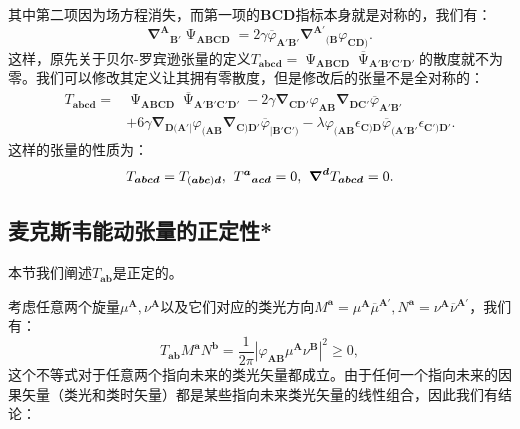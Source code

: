 其中第二项因为场方程消失，而第一项的$\boldsymbol{BCD}$指标本身就是对称的，我们有：
\begin{equation*}
	\boldsymbol{\nabla }^{\boldsymbol{A}}{}_{\boldsymbol{B} '} \upPsi _{\boldsymbol{ABCD}} =2\gamma \overline{\varphi }_{\boldsymbol{A} '\boldsymbol{B} '}\boldsymbol{\nabla }^{\boldsymbol{A} '}{}_{(\boldsymbol{B}} \varphi _{\boldsymbol{CD})} .
\end{equation*}
这样，原先关于贝尔-罗宾逊张量的定义$T_{\boldsymbol{abcd}} =\upPsi _{\boldsymbol{ABCD}}\overline{\upPsi }_{\boldsymbol{A} '\boldsymbol{B} '\boldsymbol{C} '\boldsymbol{D} '}$的散度就不为零。我们可以修改其定义让其拥有零散度，但是修改后的张量不是全对称的：
\begin{equation*}
	\begin{aligned}
		T_{\boldsymbol{abcd}} = & \upPsi _{\boldsymbol{ABCD}}\overline{\upPsi }_{\boldsymbol{A} '\boldsymbol{B} '\boldsymbol{C} '\boldsymbol{D} '} -2\gamma \boldsymbol{\nabla }_{\boldsymbol{CD} '} \varphi _{\boldsymbol{AB}}\boldsymbol{\nabla }_{\boldsymbol{DC} '}\overline{\varphi }_{\boldsymbol{A} '\boldsymbol{B} '}\\
		& +6\gamma \boldsymbol{\nabla }_{\boldsymbol{D}(\boldsymbol{A} '|} \varphi _{(\boldsymbol{AB}}\boldsymbol{\nabla }_{\boldsymbol{C})\boldsymbol{D} '}\overline{\varphi }_{|\boldsymbol{B} '\boldsymbol{C} ')} -\lambda \varphi _{(\boldsymbol{AB}} \epsilon _{\boldsymbol{C})\boldsymbol{D}}\overline{\varphi }_{(\boldsymbol{A} '\boldsymbol{B} '} \epsilon _{\boldsymbol{C} ')\boldsymbol{D} '} .
	\end{aligned}
\end{equation*}
这样的张量的性质为：
\begin{equation*}
	T_{\boldsymbol{abcd}} =T_{(\boldsymbol{abc})\boldsymbol{d}} ,\kern+0.4em T^{\boldsymbol{a}}{}_{\boldsymbol{acd}} =0,\kern+0.4em \boldsymbol{\nabla }^{\boldsymbol{d}} T_{\boldsymbol{abcd}} =0.
\end{equation*}
\subsection{麦克斯韦能动张量的正定性*}

本节我们阐述$T_{\boldsymbol{ab}}$是正定的。



考虑任意两个旋量$\mu ^{\boldsymbol{A}} ,\nu ^{\boldsymbol{A}}$以及它们对应的类光方向$M^{\boldsymbol{a}} =\mu ^{\boldsymbol{A}}\overline{\mu }^{\boldsymbol{A} '} ,N^{\boldsymbol{a}} =\nu ^{\boldsymbol{A}}\overline{\nu }^{\boldsymbol{A} '}$，我们有：
\begin{equation*}
	T_{\boldsymbol{ab}} M^{\boldsymbol{a}} N^{\boldsymbol{b}} =\frac{1}{2\pi }\left| \varphi _{\boldsymbol{AB}} \mu ^{\boldsymbol{A}} \nu ^{\boldsymbol{B}}\right| ^{2} \geq 0,
\end{equation*}
这个不等式对于任意两个指向未来的类光矢量都成立。由于任何一个指向未来的因果矢量（类光和类时矢量）都是某些指向未来类光矢量的线性组合，因此我们有结论：

